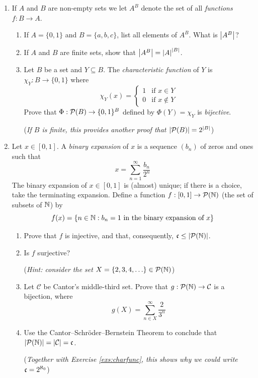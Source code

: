 \begin{exercises}{}{}
\begin{enumerate}
  
		\item\label{exs:charfunc} If $A$ and $B$ are non-empty sets we let $A^B$ denote the set of all \emph{functions} $f:B\to A$.
		\begin{enumerate}
	    \item If $A=\{0,1\}$ and $B=\{a,b,c\}$, list all elements of $A^B$. What is $\left| A^B\right|$?
	    \item If $A$ and $B$ are finite sets, show that $\left| A^B\right| = \left| A\right|^{\left| B\right|}$.
	    \item Let $B$ be a set and $Y\subseteq B$. The \emph{characteristic function} of $Y$ is $\chi_Y:B\to\{0,1\}$  where
	    \[
	    	\chi_Y(x)=
	    	\begin{cases}
	        1 &\text{if } x\in Y\\
	        0 &\text{if } x\notin Y
	      \end{cases}
	    \]
	    Prove that $\Phi:\mathcal{P}(B)\to\{0,1\}^B$ defined by $\Phi(Y)=\chi_Y$ is \emph{bijective}.\par
	    (\emph{If $B$ is finite, this provides another proof that $\left| \mathcal{P}(B)\right| = 2^{\left| B\right|}$})
		\end{enumerate}

  		
		\item\label{exs:middlethirdcard} Let $x\in[0,1]$. A \emph{binary expansion} of $x$ is a sequence $(b_n)$ of zeros and ones such that
	  \[
	  	x=\sum_{n=1}^\infty \frac{b_n}{2^n}
	  \]
	  The binary expansion of $x\in[0,1]$ is (almost) unique;\footnotemark{} if there is a choice, take the terminating expansion. Define a function $f:[0,1]\to\mathcal{P}(\mathbb{N})$ (the set of subsets of $\mathbb{N}$) by
	  \[
	  	f(x)=\{n\in\mathbb{N}:b_n=1\text{ in the binary expansion of $x$}\}
	  \]
	  \begin{enumerate}
	    \item Prove that $f$ is injective, and that, consequently, $\mathfrak{c}\le\left| \mathcal{P}(\mathbb{N})\right|$.
	    \item Is $f$ surjective?\par
	    (\emph{Hint: consider the set $X=\{2,3,4,\ldots\}\in\mathcal{P}(\mathbb{N})$})
			\item Let $\mathcal C$ be Cantor's middle-third set. Prove that $g:\mathcal{P}(\mathbb{N})\to\mathcal C$ is a bijection, where
			\[
				g(X)=\sum\limits_{n\in X}^\infty\frac{2}{3^n}
			\]
			\item Use the Cantor--Schröder--Bernstein Theorem to conclude that $\left| \mathcal{P}(\mathbb{N})\right|=\left| \mathcal C\right|=\mathfrak{c}$.\par
			(\emph{Together with Exercise \ref{exs:charfunc}, this shows why we could write $\mathfrak{c}=2^{\aleph_0}$})
		\end{enumerate}

	\end{enumerate}

\end{exercises}

